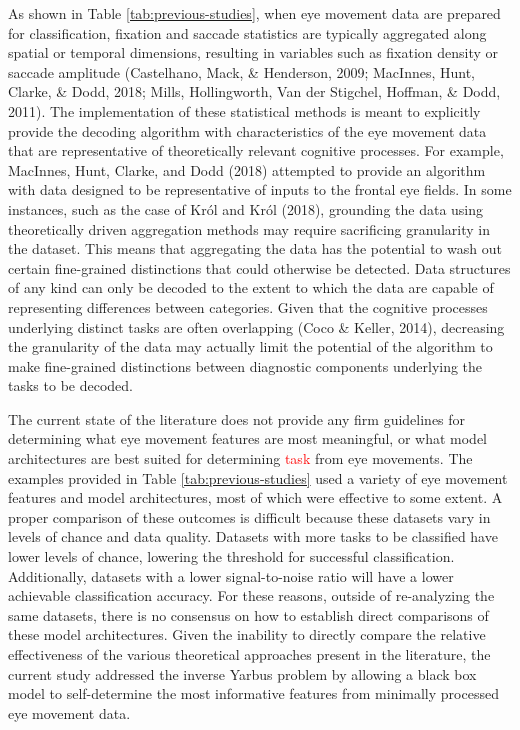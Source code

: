 \documentclass[
  english,
  man, donotrepeattitle,floatsintext]{apa6}
\begin{document}
As shown in Table \ref{tab:previous-studies}, when eye movement data are prepared for classification, fixation and saccade statistics are typically aggregated along spatial or temporal dimensions, resulting in variables such as fixation density or saccade amplitude (Castelhano, Mack, \& Henderson, 2009; MacInnes, Hunt, Clarke, \& Dodd, 2018; Mills, Hollingworth, Van der Stigchel, Hoffman, \& Dodd, 2011). The implementation of these statistical methods is meant to explicitly provide the decoding algorithm with characteristics of the eye movement data that are representative of theoretically relevant cognitive processes. For example, MacInnes, Hunt, Clarke, and Dodd (2018) attempted to provide an algorithm with data designed to be representative of inputs to the frontal eye fields. In some instances, such as the case of Król and Król (2018), grounding the data using theoretically driven aggregation methods may require sacrificing granularity in the dataset. This means that aggregating the data has the potential to wash out certain fine-grained distinctions that could otherwise be detected. Data structures of any kind can only be decoded to the extent to which the data are capable of representing differences between categories. Given that the cognitive processes underlying distinct tasks are often overlapping (Coco \& Keller, 2014), decreasing the granularity of the data may actually limit the potential of the algorithm to make fine-grained distinctions between diagnostic components underlying the tasks to be decoded.

The current state of the literature does not provide any firm guidelines for determining what eye movement features are most meaningful, or what model architectures are best suited for determining \textcolor{red}{task} from eye movements. The examples provided in Table \ref{tab:previous-studies} used a variety of eye movement features and model architectures, most of which were effective to some extent. A proper comparison of these outcomes is difficult because these datasets vary in levels of chance and data quality. Datasets with more tasks to be classified have lower levels of chance, lowering the threshold for successful classification. Additionally, datasets with a lower signal-to-noise ratio will have a lower achievable classification accuracy. For these reasons, outside of re-analyzing the same datasets, there is no consensus on how to establish direct comparisons of these model architectures. Given the inability to directly compare the relative effectiveness of the various theoretical approaches present in the literature, the current study addressed the inverse Yarbus problem by allowing a black box model to self-determine the most informative features from minimally processed eye movement data.
\end{document}
